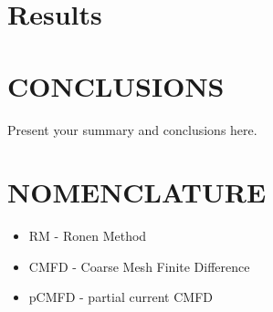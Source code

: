 \documentclass[letterpaper]{physor2020}
\begin{document}
\section{Results} 
\label{sec:res}


\section{CONCLUSIONS}
\label{sec:conc}

Present your summary and conclusions here.





\section*{NOMENCLATURE}

\begin{itemize} \itemsep1pt \parskip0pt 
\item RM - Ronen Method
\item CMFD - Coarse Mesh Finite Difference
\item pCMFD - partial current CMFD
\end{itemize}
\end{document}
